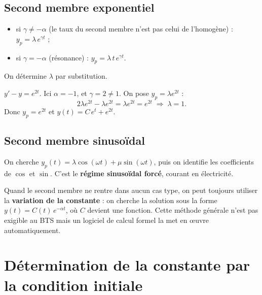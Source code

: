 \documentclass[a4paper,11pt]{article}
\begin{document}
\subsection{Second membre exponentiel}

\begin{methode}[-- $c(t) = P\,e^{\gamma t}$]
\begin{itemize}
  \item si $\gamma \neq -\alpha$ (le taux du second membre n'est pas celui de l'homogène) : $y_p = \lambda\,e^{\gamma t}$ ;
  \item si $\gamma = -\alpha$ (résonance) : $y_p = \lambda\,t\,e^{\gamma t}$.
\end{itemize}
On détermine $\lambda$ par substitution.
\end{methode}

\begin{exemple}
$y' - y = e^{2t}$. Ici $\alpha = -1$, et $\gamma = 2 \neq 1$. On pose $y_p = \lambda e^{2t}$ :
\[
2\lambda e^{2t} - \lambda e^{2t} = \lambda e^{2t} = e^{2t} \;\Rightarrow\; \lambda = 1.
\]
Donc $y_p = e^{2t}$ et $y(t) = C\,e^{t} + e^{2t}$.
\end{exemple}

\subsection{Second membre sinusoïdal}

\begin{methode}[-- $c(t) = P\cos(\omega t) + Q\sin(\omega t)$]
On cherche $y_p(t) = \lambda\cos(\omega t) + \mu\sin(\omega t)$, puis on identifie les coefficients de $\cos$ et $\sin$. C'est le \textbf{régime sinusoïdal forcé}, courant en électricité.
\end{methode}

\begin{remarque}
Quand le second membre ne rentre dans aucun cas type, on peut toujours utiliser la \textbf{variation de la constante} : on cherche la solution sous la forme $y(t) = C(t)\,e^{-\alpha t}$, où $C$ devient une fonction. Cette méthode générale n'est pas exigible au BTS mais un logiciel de calcul formel la met en {\oe}uvre automatiquement.
\end{remarque}

\newpage
\section{Détermination de la constante par la condition initiale}
\end{document}
